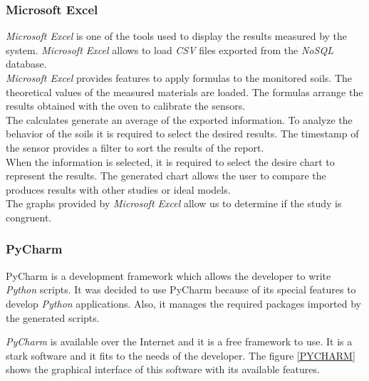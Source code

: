 \subsubsection{Microsoft Excel}

\textit{Microsoft Excel} is one of the tools used to display the results measured by the system. \textit{Microsoft Excel} allows to load \textit{CSV} files exported from the \textit{NoSQL} database.\\

\textit{Microsoft Excel} provides features to apply formulas to the monitored soils. The theoretical values of the measured materials are loaded. The formulas arrange the results obtained with the oven to calibrate the sensors.\\

The calculates generate an average of the exported information. To analyze the behavior of the soils it is required to select the desired results. The timestamp of the sensor provides a filter to sort the results of the report.\\

When the information is selected, it is required to select the desire chart to represent the results. The generated chart allows the user to compare the produces results with other studies or ideal models.\\

The graphs provided by \textit{Microsoft Excel} allow us to determine if the study is congruent.

\subsubsection{PyCharm}

PyCharm is a development framework which allows the developer to write \textit{Python} scripts. It was decided to use PyCharm because of its special features to develop \textit{Python} applications. Also, it manages the required packages \cite{install_python_modules, pyserial_package, pip} imported by the generated scripts.

\textit{PyCharm} is available over the Internet and it is a free framework to use. It is a stark software and it fits to the needs of the developer. The figure \ref{PYCHARM} shows the graphical interface of this software with its available features.

